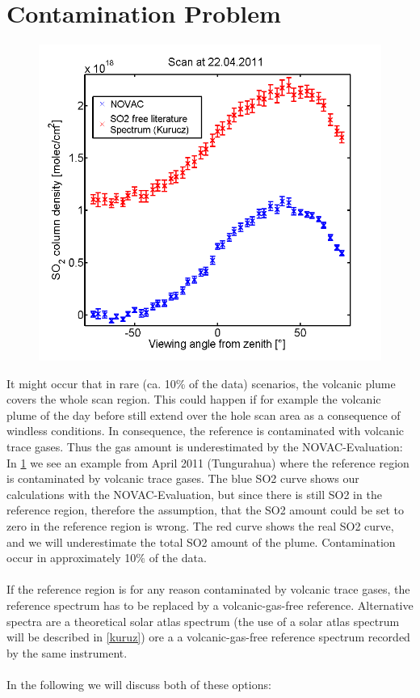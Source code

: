 \documentclass  [
  paper    = a4,
  BCOR     = 10mm,
  twoside,
  fontsize = 12pt,
  fleqn,
  toc      = bibnumbered,
  toc      = listofnumbered,
  numbers  = noendperiod,
  headings = normal,
  listof   = leveldown,
  version  = 3.03
]                                       {scrreprt}
\begin{document}
	

	\section{Contamination Problem}
	\begin{figure}
		\centering
		\includegraphics[width=0.7\linewidth]{Bilder/contaminated}
		\caption{}
		\label{fig:contaminated}
	\end{figure}
	
	It might occur that in rare (ca. 10\% of the data) scenarios, the
	volcanic plume covers the whole scan region.
	This could happen if for example the volcanic plume of the day before still extend over the hole scan area as a consequence of windless conditions.
	In consequence, the reference	is contaminated with volcanic trace gases. Thus the gas amount is underestimated by the NOVAC-Evaluation: In \cref{fig:contaminated} we see an example from April 2011 (Tungurahua) where the reference region is contaminated by volcanic trace gases. The blue SO2 curve shows our calculations with the NOVAC-Evaluation, but since there is still SO2 in the reference region, therefore the assumption, that the SO2 amount could be set to zero in the reference region is wrong. The red curve shows the real SO2 curve, and we will underestimate the total SO2 amount of the plume. Contamination occur in approximately 10$\%$ of the data.\\
	\\
	If the reference region is for any reason
	contaminated by volcanic trace gases, the reference spectrum has to be
	replaced by a volcanic-gas-free reference. Alternative spectra are a
	theoretical solar atlas spectrum (the use of a solar atlas spectrum will be described in \cref{kuruz}) ore a a volcanic-gas-free reference
	spectrum recorded by the same instrument.\\ 
	\\
	In the following we will discuss both of these options:
\end{document}
